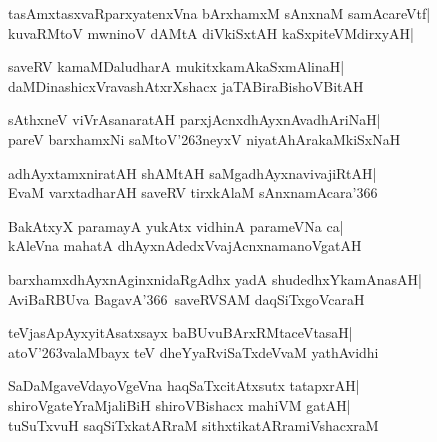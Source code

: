 \documentclass[twoside,12pt,openright]{book}
\def\S{\char'263}
\newcounter{shloka}[chapter]
\begin{document}
\begin{shloka}%
tasAmxtasxvaRparxyatenxVna bArxhamxM sAnxnaM samAcareVtf|\\
kuvaRMtoV mwninoV dAMtA diVkiSxtAH kaSxpiteVMdirxyAH|\\
\end{shloka}

\begin{shloka}%
saveRV kamaMDaludharA mukitxkamAkaSxmAlinaH|\\
daMDinashicxVravashAtxrXshacx jaTABiraBishoVBitAH
\end{shloka}

\begin{shloka}%
sAthxneV viVrAsanaratAH parxjAcnxdhAyxnAvadhAriNaH|\\
pareV barxhamxNi saMtoV\S neyxV niyatAhArakaMkiSxNaH
\end{shloka}

\begin{shloka}%
adhAyxtamxniratAH shAMtAH saMgadhAyxnavivajiRtAH|\\
EvaM varxtadharAH saveRV tirxkAlaM sAnxnamAcara\char'366
\end{shloka}

\begin{shloka}%
BakAtxyX paramayA yukAtx vidhinA parameVNa ca|\\
kAleVna mahatA dhAyxnAdedxVvajAcnxnamanoVgatAH
\end{shloka}

\begin{shloka}%
barxhamxdhAyxnAginxnidaRgAdhx yadA shudedhxYkamAnasAH|\\
AviBaRBUva BagavA\char'366\  saveRVSAM daqSiTxgoVcaraH
\end{shloka}

\begin{shloka}%
teVjasApAyxyitAsatxsayx baBUvuBArxRMtaceVtasaH|\\
atoV\S valaMbayx teV dheYyaRviSaTxdeVvaM yathAvidhi
\end{shloka}

\begin{shloka}%
SaDaMgaveVdayoVgeVna haqSaTxcitAtxsutx tatapxrAH|\\
shiroVgateYraMjaliBiH shiroVBishacx mahiVM gatAH|\\
tuSuTxvuH saqSiTxkatARraM sithxtikatARramiVshacxraM
\end{shloka}

\begin{shloka}%
\end{shloka}
\end{document}
